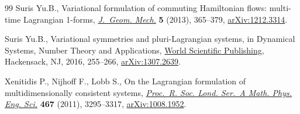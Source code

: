 \documentclass[pdftex]{sigma}
\numberwithin{equation}{section}
\begin{document}
\begin{thebibliography}{99}
Suris Yu.B., Variational formulation of commuting {H}amiltonian flows:
 multi-time {L}agrangian 1-forms,
 \href{https://doi.org/10.3934/jgm.2013.5.365}{\textit{J.~Geom. Mech.}}
 \textbf{5} (2013), 365--379,
 \href{http://arxiv.org/abs/1212.3314}{arXiv:1212.3314}.

Suris Yu.B., Variational symmetries and pluri-{L}agrangian systems, in Dynamical
 Systems, Number Theory and Applications,
 \href{https://doi.org/10.1142/9789814699877_0013}{World Scientific
 Publishing}, Hackensack, NJ, 2016, 255--266,
 \href{http://arxiv.org/abs/1307.2639}{arXiv:1307.2639}.

Xenitidis P., Nijhoff F., Lobb S., On the {L}agrangian formulation of
 multidimensionally consistent systems,
 \href{https://doi.org/10.1098/rspa.2011.0124}{\textit{Proc.~R. Soc. Lond.
 Ser.~A Math. Phys. Eng. Sci.}} \textbf{467} (2011), 3295--3317,
 \href{http://arxiv.org/abs/1008.1952}{arXiv:1008.1952}.

\end{thebibliography}\LastPageEnding
\end{document}

